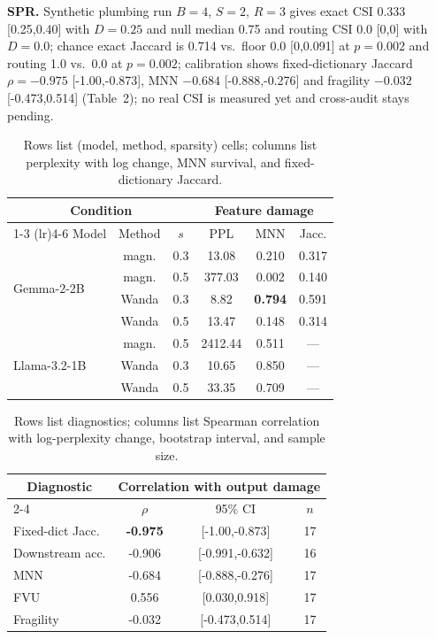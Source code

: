 \documentclass[11pt,a4paper]{article}
\begin{document}
\textbf{SPR.} Synthetic plumbing run $B{=}4$, $S{=}2$, $R{=}3$ gives exact CSI 0.333 [0.25,0.40] with $D{=}0.25$ and null median 0.75 and routing CSI 0.0 [0,0] with $D{=}0.0$; chance exact Jaccard is 0.714 vs.\ floor 0.0 [0,0.091] at $p{=}0.002$ and routing 1.0 vs.\ 0.0 at $p{=}0.002$; calibration shows fixed-dictionary Jaccard $\rho{=}-0.975$ [-1.00,-0.873], MNN $-0.684$ [-0.888,-0.276] and fragility $-0.032$ [-0.473,0.514] (Table~2); no real CSI is measured yet and cross-audit stays pending.
\begin{table}[!ht]
\centering\footnotesize
\caption{Rows list (model, method, sparsity) cells; columns list perplexity with log change, MNN survival, and fixed-dictionary Jaccard.}
\begin{tabular}{@{}lccccc@{}}
\toprule
\multicolumn{3}{c}{Condition} & \multicolumn{3}{c}{Feature damage} \\
\cmidrule(lr){1-3} \cmidrule(lr){4-6}
Model & Method & $s$ & PPL & MNN & Jacc. \\
\midrule
\multirow{4}{*}{Gemma-2-2B} & magn. & 0.3 & 13.08 & 0.210 & 0.317 \\
& magn. & 0.5 & 377.03 & 0.002 & 0.140 \\
& Wanda & 0.3 & 8.82 & \textbf{0.794} & 0.591 \\
& Wanda & 0.5 & 13.47 & 0.148 & 0.314 \\
\multirow{3}{*}{Llama-3.2-1B} & magn. & 0.5 & 2412.44 & 0.511 & --- \\
& Wanda & 0.3 & 10.65 & 0.850 & --- \\
& Wanda & 0.5 & 33.35 & 0.709 & --- \\
\bottomrule
\end{tabular}
\end{table}
\begin{table}[!ht]
\centering\footnotesize
\caption{Rows list diagnostics; columns list Spearman correlation with log-perplexity change, bootstrap interval, and sample size.}
\begin{tabular}{@{}lccc@{}}
\toprule
\multicolumn{1}{c}{Diagnostic} & \multicolumn{3}{c}{Correlation with output damage} \\
\cmidrule(lr){2-4}
& $\rho$ & 95\% CI & $n$ \\
\midrule
Fixed-dict Jacc. & \textbf{-0.975} & [-1.00,-0.873] & 17 \\
Downstream acc. & -0.906 & [-0.991,-0.632] & 16 \\
MNN & -0.684 & [-0.888,-0.276] & 17 \\
FVU & 0.556 & [0.030,0.918] & 17 \\
Fragility & -0.032 & [-0.473,0.514] & 17 \\
\bottomrule
\end{tabular}
\end{table}
\end{document}
